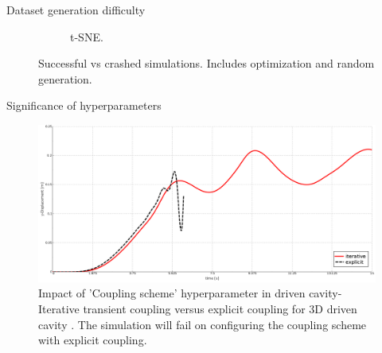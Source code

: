 \documentclass[10pt]{beamer}
\begin{document}
\begin{frame}{Dataset generation difficulty}
\begin{figure}[!ht]
\begin{subfigure}{.5\textwidth}
          \caption{t-SNE.}
    \end{subfigure}
        \caption{Successful vs crashed simulations. Includes optimization and random generation.}
        \label{Fig:dataset_challenge}
    \end{figure}

\end{frame}


\begin{frame}{Significance of hyperparameters}

\begin{figure}[!ht]
\centering
\includegraphics[width=\textwidth]{images/driven_cavity_result1.png}
\captionsetup{justification=justified}
\caption[An illustration of the significance of hyperparameters]{Impact of 'Coupling scheme' hyperparameter in driven cavity- Iterative transient coupling versus explicit coupling for 3D driven cavity \cite{MpCCI_documentation}. The simulation will fail on configuring the coupling scheme with explicit coupling.}
\label{Fig:iterative_vs_explicit}
\end{figure}
\end{frame}
\end{document}
